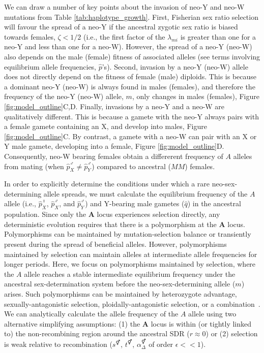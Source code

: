 \documentclass[10pt,letterpaper]{article}
\begin{document}
We can draw a number of key points about the invasion of neo-Y and neo-W mutations from Table \ref{tab:haplotype_growth}. 
First, Fisherian sex ratio selection will favour the spread of a neo-Y if the ancestral zygotic sex ratio is biased towards females, $\zeta<1/2$ (i.e., the first factor of the $\lambda_{mi}$ is greater than one for a neo-Y and less than one for a neo-W).
However, the spread of a neo-Y (neo-W) also depends on the male (female) fitness of associated alleles (see terms involving equilibrium allele frequencies, $\hat{p}$'s).
Second, invasion by a neo-Y (neo-W) allele does not directly depend on the fitness of female (male) diploids. %
This is because a dominant neo-Y (neo-W) is always found in males (females), and therefore the frequency of the neo-Y (neo-W) allele, $m$, only changes in males (females), Figure \ref{fig:model_outline}C,D. 
Finally, invasions by a neo-Y and a neo-W are qualitatively different.
This is because a gamete with the neo-Y always pairs with a female gamete containing an X, and develop into males, Figure \ref{fig:model_outline}C.
By contrast, a gamete with a neo-W can pair with an X or Y male gamete, developing into a female, Figure \ref{fig:model_outline}D.
Consequently, neo-W bearing females obtain a differerent frequency of $A$ alleles from mating (when $\hat{p}_X^\male \neq \hat{p}_Y^\male$) compared to ancestral ($MM$) females.

In order to explicitly determine the conditions under which a rare neo-sex-determining allele spreads, we must calculate the equilibrium frequency of the $A$ allele (i.e., $\hat{p}^\female_X$, $\hat{p}^\male_X$, and $\hat{p}^\male_Y$) and Y-bearing male gametes ($\hat{q}$) in the ancestral population. 
Since only the \textbf{A} locus experiences selection directly, any deterministic evolution requires that there is a polymorphism at the \textbf{A} locus. 
Polymorphisms can be maintained by mutation-selection balance or transiently present during the spread of beneficial alleles. However, polymorphisms maintained by selection can maintain alleles at intermediate allele frequencies for longer periods. 
Here, we focus on polymorphisms maintained by selection, where the $A$ allele reaches a stable intermediate equilibrium frequency under the ancestral sex-determination system before the neo-sex-determining allele ($m$) arises. 
Such polymorphisms can be maintained by heterozygote advantage, sexually-antagonistic selection, ploidally-antagonistic selection, or a combination~\cite{Immler:2012tl}.
We can analytically calculate the allele frequency of the $A$ allele using two alternative simplifying assumptions: 
(1) the \textbf{A} locus is within (or tightly linked to) the non-recombining region around the ancestral SDR ($r \approx 0$) or (2) selection is weak relative to recombination ($s^\Hermaphrodite$, $t^\Hermaphrodite$, $\alpha_{\Delta}^\Hermaphrodite$ of order $\epsilon<<1$). 
\end{document}
